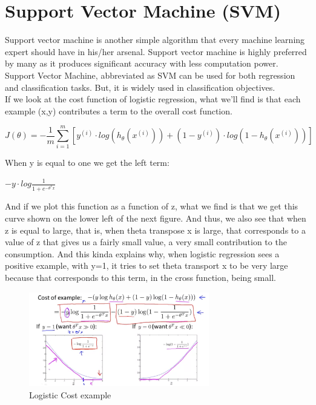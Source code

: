 \chapter{Support Vector Machine (SVM)}

Support vector machine is another simple algorithm that every machine learning expert should have in his/her arsenal. Support vector machine is highly preferred by many as it produces significant accuracy with less computation power. Support Vector Machine, abbreviated as SVM can be used for both regression and classification tasks. But, it is widely used in classification objectives.\\

If we look at the cost function of logistic regression, what we'll find is that each example (x,y) contributes a term to the overall cost function.\\

\begin{center}
	$$J(\theta) = -\frac{1}{m}\sum_{i=1}^{m}\left[y^{(i)}\cdot log(h_\theta(x^{(i)})) +(1-y^{(i)})\cdot log(1-h_\theta(x^{(i)}))\right] $$
\end{center}

When y is equal to one we get the left term: 

\begin{center}
\Large{
$- y \cdot log \frac{1}{1 + e^{ - \theta^T x}} $}
\end{center}

And if we plot this function as a function of z, what we find is that we get this curve shown on the lower left of the next figure. And thus, we also see that when z is equal to large, that is, when theta transpose x is large, that corresponds to a value of z that gives us a fairly small value, a very small contribution to the consumption. And this kinda explains why, when logistic regression sees a positive example, with y=1, it tries to set theta transport x to be very large because that corresponds to this term, in the cross function, being small. \\

\begin{figure}[h!]
	\centering
	\includegraphics[width=0.7\textwidth]{fig/SVM}
	\caption{Logistic Cost example}
	\label{fig:svm}
\end{figure}

